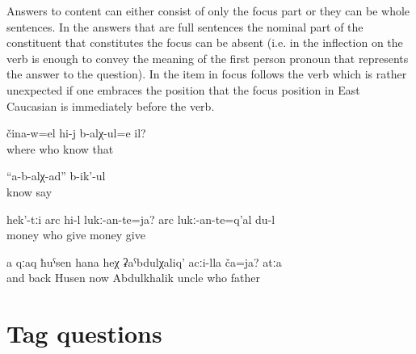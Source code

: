 Answers to content  can either consist of only the focus part  or they can be whole sentences. In the answers that are full sentences the nominal part of the constituent that constitutes the focus can be absent (i.e. in  the inflection on the verb is enough to convey the meaning of the first person pronoun that represents the answer to the question). In  the item in focus follows the verb which is rather unexpected if one embraces the position that the focus position in East Caucasian is immediately before the verb.
%
\begin{exe}
	\ex	\label{ex:‎‎‎Who knows where he is}
	\gll	čina-w=el	hi-j	b-alχ-ul=e	il?\\
		where	who	know	that\\
	\glt	{}

	\ex	\label{ex:‎‎We do not know, they say}
	\gll	``a-b-alχ-ad''	b-ik'-ul\\
		know	say\\
	\glt	{}

	\ex	\label{ex:‎‎‎Who should give this money (back)? ‎‎I have to give the money back}
	\gll	hek'-tːi	arc	hi-l	lukː-an-te=ja?		arc	lukː-an-te=q'al	du-l\\
			money	who	give	money	give	\\
	\glt	{}

	\ex	\label{ex:‎And Kak Husen, who is he with respect to uncle Abdukhalik? The Father}
	\gll	a	qːaq	ħuˁsen	hana	heχ	ʡaˁbdulχaliq'	acːi-lla	ča=ja? 		atːa\\
		and	back	Husen	now		Abdulkhalik	uncle	who	 father\\
	\glt	{}
\end{exe}



\section{Tag questions}
\label{sec:Tag questions}

